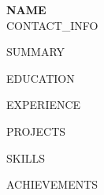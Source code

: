 \documentclass[letterpaper,11pt]{article}
\begin{document}
\begin{center}
    {\Large\textbf{{{NAME}}}}\\[4pt]
    {{CONTACT_INFO}}
\end{center}

\vspace{8pt}

{{SUMMARY}}

{{EDUCATION}}

{{EXPERIENCE}}

{{PROJECTS}}

{{SKILLS}}

{{ACHIEVEMENTS}}
\end{document}
